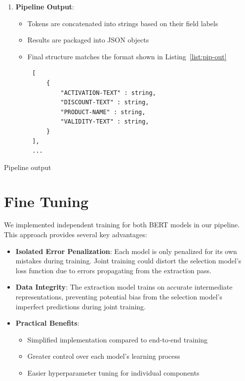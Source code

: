 \documentclass[licencjacka,en]{pracamgr}
\begin{document}
\begin{enumerate}
    \item \textbf{Pipeline Output}:
    \begin{itemize}
        \item Tokens are concatenated into strings based on their field labels
        \item Results are packaged into JSON objects
        \item Final structure matches the format shown in Listing~\ref{list:pip-out}
    \end{itemize}
\end{enumerate}
\begin{center}
   \begin{listing}
        \begin{verbatim}
        [
            {     
                "ACTIVATION-TEXT" : string,
                "DISCOUNT-TEXT" : string,
                "PRODUCT-NAME" : string,
                "VALIDITY-TEXT" : string,
            }
        ],
        ...
        \end{verbatim}
        \caption{Pipeline output} 
        \label{list:pip-out}
    \end{listing}
\end{center}   

\section{Fine Tuning}
We implemented independent training for both BERT models in our pipeline. This approach provides several key advantages:

\begin{itemize}
    \item \textbf{Isolated Error Penalization}: Each model is only penalized for its own mistakes during training. Joint training could distort the selection model's loss function due to errors propagating from the extraction pass.
    
    \item \textbf{Data Integrity}: The extraction model trains on accurate intermediate representations, preventing potential bias from the selection model's imperfect predictions during joint training.
    
    \item \textbf{Practical Benefits}:
    \begin{itemize}
        \item Simplified implementation compared to end-to-end training
        \item Greater control over each model's learning process
        \item Easier hyperparameter tuning for individual components
    \end{itemize}
\end{itemize}
\end{document}
